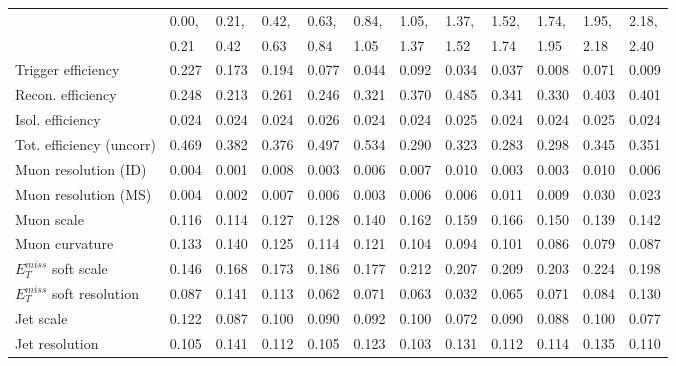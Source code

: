 {
\begin{table}
  \begin{center}
\tiny
\begin{tabular}{l|p{0.6cm}p{0.6cm}p{0.6cm}p{0.6cm}p{0.6cm}p{0.6cm}p{0.6cm}p{0.6cm}p{0.6cm}p{0.6cm}p{0.6cm}}
\hline
   & 0.00, & 0.21, & 0.42, & 0.63, & 0.84, & 1.05, & 1.37, & 1.52, & 1.74, & 1.95, & 2.18,  \\ 
   & 0.21 & 0.42 & 0.63 & 0.84 & 1.05 & 1.37 & 1.52 & 1.74 & 1.95 & 2.18 & 2.40  \\ 
\hline
Trigger efficiency                       & 0.227 & 0.173 & 0.194 & 0.077 & 0.044 & 0.092 & 0.034 & 0.037 & 0.008 & 0.071 & 0.009 \\
Recon. efficiency                        & 0.248 & 0.213 & 0.261 & 0.246 & 0.321 & 0.370 & 0.485 & 0.341 & 0.330 & 0.403 & 0.401 \\
Isol. efficiency                         & 0.024 & 0.024 & 0.024 & 0.026 & 0.024 & 0.024 & 0.025 & 0.024 & 0.024 & 0.025 & 0.024 \\
Tot. efficiency (uncorr)                 & 0.469 & 0.382 & 0.376 & 0.497 & 0.534 & 0.290 & 0.323 & 0.283 & 0.298 & 0.345 & 0.351 \\
Muon resolution (ID)                     & 0.004 & 0.001 & 0.008 & 0.003 & 0.006 & 0.007 & 0.010 & 0.003 & 0.003 & 0.010 & 0.006 \\
Muon resolution (MS)                     & 0.004 & 0.002 & 0.007 & 0.006 & 0.003 & 0.006 & 0.006 & 0.011 & 0.009 & 0.030 & 0.023 \\
Muon scale                               & 0.116 & 0.114 & 0.127 & 0.128 & 0.140 & 0.162 & 0.159 & 0.166 & 0.150 & 0.139 & 0.142 \\
Muon curvature                           & 0.133 & 0.140 & 0.125 & 0.114 & 0.121 & 0.104 & 0.094 & 0.101 & 0.086 & 0.079 & 0.087 \\
$E_{T}^{miss}$ soft scale                  & 0.146 & 0.168 & 0.173 & 0.186 & 0.177 & 0.212 & 0.207 & 0.209 & 0.203 & 0.224 & 0.198 \\
$E_{T}^{miss}$ soft resolution             & 0.087 & 0.141 & 0.113 & 0.062 & 0.071 & 0.063 & 0.032 & 0.065 & 0.071 & 0.084 & 0.130 \\
Jet scale                                & 0.122 & 0.087 & 0.100 & 0.090 & 0.092 & 0.100 & 0.072 & 0.090 & 0.088 & 0.100 & 0.077 \\
Jet resolution                           & 0.105 & 0.141 & 0.112 & 0.105 & 0.123 & 0.103 & 0.131 & 0.112 & 0.114 & 0.135 & 0.110 \\

\end{tabular}
\end{center}
\end{table}}
